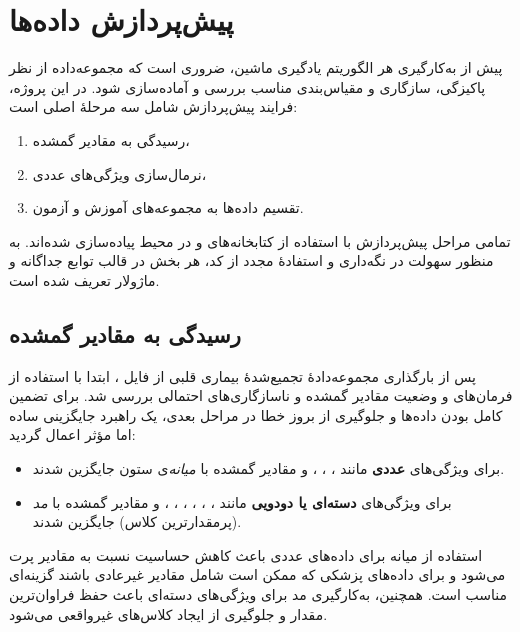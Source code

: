 \section{پیش‌پردازش داده‌ها}

پیش از به‌کارگیری هر الگوریتم یادگیری ماشین، ضروری است که مجموعه‌داده از نظر پاکیزگی، سازگاری
و مقیاس‌بندی مناسب بررسی و آماده‌سازی شود. در این پروژه، فرایند پیش‌پردازش شامل سه مرحلهٔ اصلی است:

\begin{enumerate}
	\item رسیدگی به مقادیر گمشده،
	\item نرمال‌سازی ویژگی‌های عددی،
	\item تقسیم داده‌ها به مجموعه‌های آموزش و آزمون.
\end{enumerate}

تمامی مراحل پیش‌پردازش با استفاده از کتابخانه‌های  و  در محیط
 پیاده‌سازی شده‌اند. به منظور سهولت در نگه‌داری و استفادهٔ مجدد از کد،
هر بخش در قالب توابع جداگانه و ماژولار تعریف شده است.

\subsection{رسیدگی به مقادیر گمشده}

پس از بارگذاری مجموعه‌دادهٔ تجمیع‌شدهٔ بیماری قلبی از فایل ، ابتدا با استفاده از
فرمان‌های  و  وضعیت مقادیر گمشده و ناسازگاری‌های احتمالی
بررسی شد. برای تضمین کامل بودن داده‌ها و جلوگیری از بروز خطا در مراحل بعدی، یک راهبرد
جایگزینی ساده اما مؤثر اعمال گردید:

\begin{itemize}
	\item برای ویژگی‌های \textbf{عددی} مانند ، ، ،  و 
	مقادیر گمشده با \emph{میانه}‌ی ستون جایگزین شدند.
	
	\item برای ویژگی‌های \textbf{دسته‌ای یا دودویی} مانند ، ، ، ،
	، ،  و  مقادیر گمشده با \emph{مد} (پرمقدارترین کلاس) جایگزین شدند.
\end{itemize}

استفاده از میانه برای داده‌های عددی باعث کاهش حساسیت نسبت به مقادیر پرت می‌شود و برای داده‌های
پزشکی که ممکن است شامل مقادیر غیرعادی باشند گزینه‌ای مناسب است. همچنین، به‌کارگیری مد برای
ویژگی‌های دسته‌ای باعث حفظ فراوان‌ترین مقدار و جلوگیری از ایجاد کلاس‌های غیرواقعی می‌شود.

